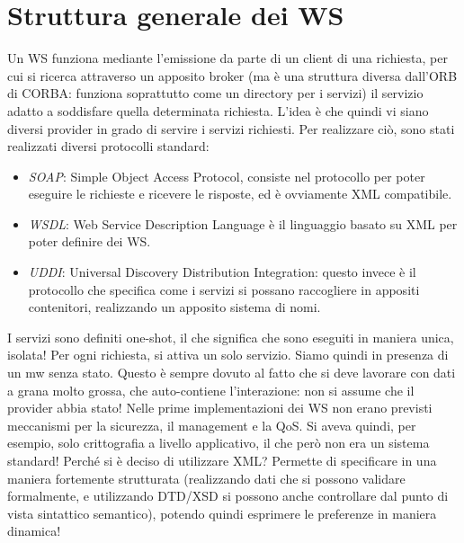 \section{Struttura generale dei WS}
Un WS funziona mediante l'emissione da parte di un client di una richiesta, per cui si ricerca attraverso un apposito
broker (ma è una struttura diversa dall'ORB di CORBA: funziona soprattutto come un directory per i servizi) il
servizio adatto a soddisfare quella determinata richiesta.
L'idea è che quindi vi siano diversi provider in grado di servire i servizi richiesti. Per realizzare ciò, sono stati
realizzati diversi protocolli standard:
\begin{itemize}
 \item \textit{SOAP}: Simple Object Access Protocol, consiste nel protocollo per poter eseguire le richieste e ricevere
 le risposte, ed è ovviamente XML compatibile.
 \item \textit{WSDL}: Web Service Description Language è il linguaggio basato su XML per poter definire dei WS.
 \item \textit{UDDI}: Universal Discovery Distribution Integration: questo invece è il protocollo che specifica come i
 servizi si possano raccogliere in appositi contenitori, realizzando un apposito sistema di nomi.
\end{itemize}
I servizi sono definiti one-shot, il che significa che sono eseguiti in maniera unica, isolata! Per ogni richiesta, si
attiva un solo servizio. Siamo quindi in presenza di un mw senza stato. Questo è sempre dovuto al fatto che si deve
lavorare con dati a grana molto grossa, che auto-contiene l'interazione: non si assume che il provider abbia stato!
Nelle prime implementazioni dei WS non erano previsti meccanismi per la sicurezza, il management e la QoS. Si aveva
quindi, per esempio, solo crittografia a livello applicativo, il che però non era un sistema standard!
Perché si è deciso di utilizzare XML? Permette di specificare in una maniera fortemente strutturata (realizzando dati
che si possono validare formalmente, e utilizzando DTD/XSD si possono anche controllare dal punto di vista
sintattico semantico), potendo quindi esprimere le preferenze in maniera dinamica!
